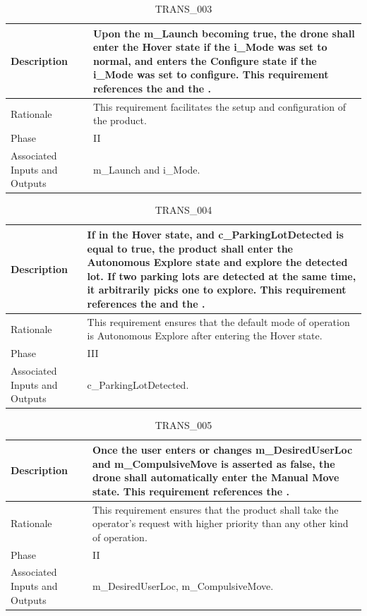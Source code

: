 \documentclass{article}
\begin{document}
\begin{table}[!h]
\begin{center}
\caption {TRANS\_003} 
\label{TRANS_003}
\begin{tabular}{ | m{3cm} | m{11cm} | }
\hline
Description & Upon the m\_Launch becoming true, the drone shall enter the Hover state if the i\_Mode was set to normal, and enters the Configure state if the i\_Mode was set to configure. This requirement references the \nameref{Hover State} and the \nameref{Configure State}. \\
\hline
Rationale & This requirement facilitates the setup and configuration of the product.  \\
\hline
Phase & II \\
\hline
Associated Inputs and Outputs & m\_Launch and i\_Mode. \\
\hline
\end{tabular}
\end{center}
\end{table}

\begin{table}[!h]
\begin{center}
\caption {TRANS\_004} 
\label{TRANS_004}
\begin{tabular}{ | m{3cm} | m{11cm} | }
\hline
Description & If in the Hover state, and c\_ParkingLotDetected is equal to true, the product shall enter the Autonomous Explore state and explore the detected lot. If two parking lots are detected at the same time, it arbitrarily picks one to explore. This requirement references the \nameref{Hover State} and the \nameref{Autonomous Explore State}. \\
\hline
Rationale & This requirement ensures that the default mode of operation is Autonomous Explore after entering the Hover state.  \\
\hline
Phase & III \\
\hline
Associated Inputs and Outputs & c\_ParkingLotDetected. \\
\hline
\end{tabular}
\end{center}
\end{table}

\begin{table}[!h]
\begin{center}
\caption {TRANS\_005} 
\label{TRANS_005}
\begin{tabular}{ | m{3cm} | m{11cm} | }
\hline
Description & Once the user enters or changes m\_DesiredUserLoc and m\_CompulsiveMove is asserted as false, the drone shall automatically enter the Manual Move state. This requirement references the \nameref{Manual Move State}. \\
\hline
Rationale & This requirement ensures that the product shall take the operator's request with higher priority than any other kind of operation. \\
\hline
Phase & II \\
\hline
Associated Inputs and Outputs & m\_DesiredUserLoc, m\_CompulsiveMove. \\
\hline
\end{tabular}
\end{center}
\end{table}
\end{document}
